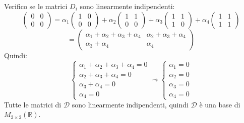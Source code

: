\documentclass[a4paper]{article}
\theoremstyle{break}
\theoremstyle{break}
\theoremstyle{break}
\theoremstyle{break}
\begin{document}
\begin{enumerate}
        \vspace{1em}
        \noindent Verifico se le matrici \( D_i \) sono linearmente indipendenti:
        \[
        \begin{pmatrix} 
          0 & 0\\
          0 & 0
        \end{pmatrix} 
        =
        \alpha_1 \begin{pmatrix} 
          1 & 0\\
          0 & 0
        \end{pmatrix}
        +
        \alpha_2 \begin{pmatrix} 
          1 & 1\\
          0 & 0
        \end{pmatrix}
        +
        \alpha_3 \begin{pmatrix} 
          1 & 1\\
          1 & 0
        \end{pmatrix}
        +
        \alpha_4 \begin{pmatrix} 
          1 & 1\\
          1 & 1
        \end{pmatrix}
        \] 
        \[
        = \begin{pmatrix} 
          \alpha_1 + \alpha_2 + \alpha_3 + \alpha_4 & \alpha_2 + \alpha_3 + \alpha_4\\
          \alpha_3 + \alpha_4 & \alpha_4
        \end{pmatrix}
        \] 
        Quindi:
        \[
        \begin{cases}
          \alpha_1 + \alpha_2 + \alpha_3 + \alpha_4 = 0\\
          \alpha_2 + \alpha_3 + \alpha_4 = 0\\
          \alpha_3 + \alpha_4 = 0\\
          \alpha_4 = 0
        \end{cases}
        \leadsto
        \begin{cases}
          \alpha_1 = 0\\
          \alpha_2 = 0\\
          \alpha_3 = 0\\
          \alpha_4 = 0
        \end{cases}
        \] 
        Tutte le matrici di \( \mathcal{D} \) sono linearmente indipendenti, quindi
        \( \mathcal{D} \) è una base di \( M_{2 \times 2}(\mathbb{R}) \).


\end{enumerate}
\end{document}
